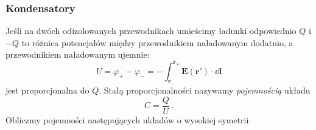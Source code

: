 \documentclass[../main.tex]{subfiles}
\begin{document}
\subsubsection{Kondensatory}
Jeśli na dwóch odizolowanych przewodnikach umieścimy ładunki odpowiednio \(Q\) i \(-Q\) to różnica potencjałów między przewodnikiem naładowanym dodatnio, a przewodnikiem naładowanym ujemnie:
\begin{equation*}
    U=\varphi_+-\varphi_-=-\int_{\mathbf{r}_-}^{\mathbf{r}_+}\mathbf{E}(\mathbf{r}')\cdot\dd{\mathbf{l}}
\end{equation*}
jest proporcjonalna do \(Q\). Stałą proporcjonalności nazywamy \textit{pojemnością} układu
\begin{equation*}
    C=\frac{Q}{U}\,.
\end{equation*}
Obliczmy pojemności następujących układów o wysokiej symetrii:
\end{document}
